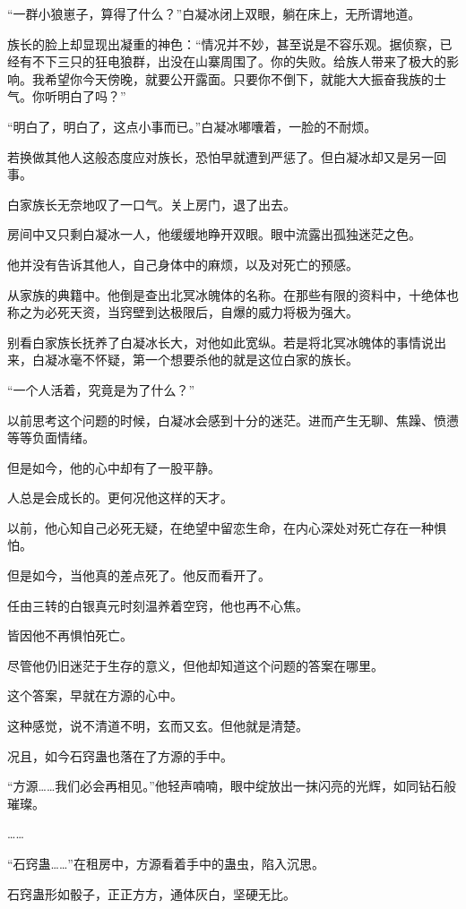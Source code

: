 \begin{this_body}
“一群小狼崽子，算得了什么？”白凝冰闭上双眼，躺在床上，无所谓地道。

族长的脸上却显现出凝重的神色：“情况并不妙，甚至说是不容乐观。据侦察，已经有不下三只的狂电狼群，出没在山寨周围了。你的失败。给族人带来了极大的影响。我希望你今天傍晚，就要公开露面。只要你不倒下，就能大大振奋我族的士气。你听明白了吗？”

“明白了，明白了，这点小事而已。”白凝冰嘟囔着，一脸的不耐烦。

若换做其他人这般态度应对族长，恐怕早就遭到严惩了。但白凝冰却又是另一回事。

白家族长无奈地叹了一口气。关上房门，退了出去。

房间中又只剩白凝冰一人，他缓缓地睁开双眼。眼中流露出孤独迷茫之色。

他并没有告诉其他人，自己身体中的麻烦，以及对死亡的预感。

从家族的典籍中。他倒是查出北冥冰魄体的名称。在那些有限的资料中，十绝体也称之为必死天资，当窍壁到达极限后，自爆的威力将极为强大。

别看白家族长抚养了白凝冰长大，对他如此宽纵。若是将北冥冰魄体的事情说出来，白凝冰毫不怀疑，第一个想要杀他的就是这位白家的族长。

“一个人活着，究竟是为了什么？”

以前思考这个问题的时候，白凝冰会感到十分的迷茫。进而产生无聊、焦躁、愤懑等等负面情绪。

但是如今，他的心中却有了一股平静。

人总是会成长的。更何况他这样的天才。

以前，他心知自己必死无疑，在绝望中留恋生命，在内心深处对死亡存在一种惧怕。

但是如今，当他真的差点死了。他反而看开了。

任由三转的白银真元时刻温养着空窍，他也再不心焦。

皆因他不再惧怕死亡。

尽管他仍旧迷茫于生存的意义，但他却知道这个问题的答案在哪里。

这个答案，早就在方源的心中。

这种感觉，说不清道不明，玄而又玄。但他就是清楚。

况且，如今石窍蛊也落在了方源的手中。

“方源……我们必会再相见。”他轻声喃喃，眼中绽放出一抹闪亮的光辉，如同钻石般璀璨。

……

“石窍蛊……”在租房中，方源看着手中的蛊虫，陷入沉思。

石窍蛊形如骰子，正正方方，通体灰白，坚硬无比。


\end{this_body}
